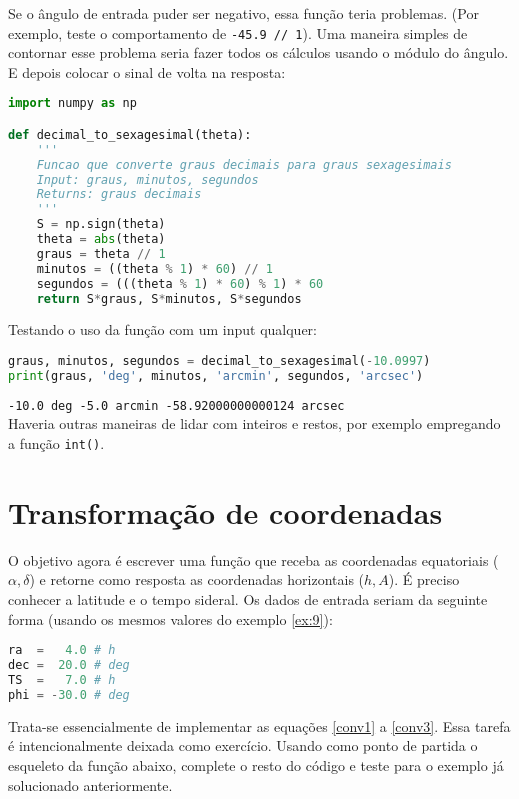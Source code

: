 \noindent Se o ângulo de entrada puder ser negativo, essa função teria problemas. (Por exemplo, teste o comportamento de \texttt{-45.9 // 1}). Uma maneira simples de contornar esse problema seria fazer
todos os cálculos usando o módulo do ângulo. E depois colocar o sinal de volta na resposta:

\begin{lstlisting}[language=Python]
import numpy as np

def decimal_to_sexagesimal(theta):
    '''
    Funcao que converte graus decimais para graus sexagesimais
    Input: graus, minutos, segundos
    Returns: graus decimais
    '''
    S = np.sign(theta)
    theta = abs(theta)
    graus = theta // 1
    minutos = ((theta % 1) * 60) // 1
    segundos = (((theta % 1) * 60) % 1) * 60
    return S*graus, S*minutos, S*segundos
\end{lstlisting}

\noindent Testando o uso da função com um input qualquer:

\begin{lstlisting}[language=Python]
graus, minutos, segundos = decimal_to_sexagesimal(-10.0997)
print(graus, 'deg', minutos, 'arcmin', segundos, 'arcsec')
\end{lstlisting}
\noindent\texttt{-10.0 deg -5.0 arcmin -58.92000000000124 arcsec}\\

Haveria outras maneiras de lidar com inteiros e restos, por exemplo empregando a função \texttt{int()}.

\newpage
\section{Transformação de coordenadas}
\label{sec:trans}

O objetivo agora é escrever uma função que receba as coordenadas equatoriais ($\alpha, \delta$) e retorne como resposta as coordenadas horizontais ($h, A$). É preciso conhecer a latitude e o tempo sideral. Os dados de entrada seriam da seguinte forma (usando os mesmos valores do exemplo \ref{ex:9}):

\begin{lstlisting}[language=Python]
ra  =   4.0 # h 
dec =  20.0 # deg
TS  =   7.0 # h
phi = -30.0 # deg
\end{lstlisting}

\noindent Trata-se essencialmente de implementar as equações \ref{conv1} a \ref{conv3}. Essa tarefa é intencionalmente deixada como exercício. Usando como ponto de partida o esqueleto da função abaixo, complete o resto do código e teste para o exemplo já solucionado anteriormente.

